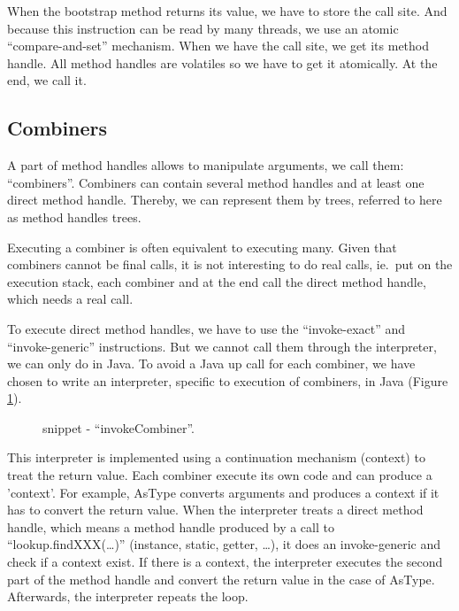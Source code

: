 \documentclass{sig-alternate}
\begin{document}
      When the bootstrap method returns its value, we have to store the call site.
      And because this instruction can be read by many threads, we use an atomic ``compare-and-set'' mechanism.
      When we have the call site, we get its method handle.
      All method handles are volatiles so we have to get it atomically.
      At the end, we call it.

    \subsection{Combiners}
    \label{combiners}

      A part of method handles allows to manipulate arguments, we call them: ``combiners''.
      Combiners can contain several method handles and at least one direct method handle.
      Thereby, we can represent them by trees, referred to here as method handles trees.

      Executing a combiner is often equivalent to executing many.
      Given that combiners cannot be final calls,
      it is not interesting to do real calls, ie.~put on the execution stack,
      each combiner and at the end call the direct method handle, which needs a real call.

      To execute direct method handles, we have to use the ``invoke-exact'' and ``invoke-generic'' instructions.
      But we cannot call them through the interpreter, we can only do in Java.
      To avoid a Java up call for each combiner, we have chosen to write an interpreter,
      specific to execution of combiners, in Java (Figure \ref{implINTERP}).

      \begin{figure}[!h]
        \centering \vspace{-1em}
        \caption{snippet - ``invokeCombiner''.}
        \label{implINTERP}
      \end{figure}

      This interpreter is implemented using a continuation mechanism (context) to treat the return value.
      Each combiner execute its own code and can produce a 'context'.
      For example, AsType converts arguments and produces a context if it has to convert the return value.
      When the interpreter treats a direct method handle,
      which means a method handle produced by a call to ``lookup.findXXX(\dots)'' (instance, static, getter, \dots),
      it does an invoke-generic and check if a context exist.
      If there is a context, the interpreter executes the second part of the method handle
      and convert the return value in the case of AsType.
      Afterwards, the interpreter repeats the loop.
\end{document}
